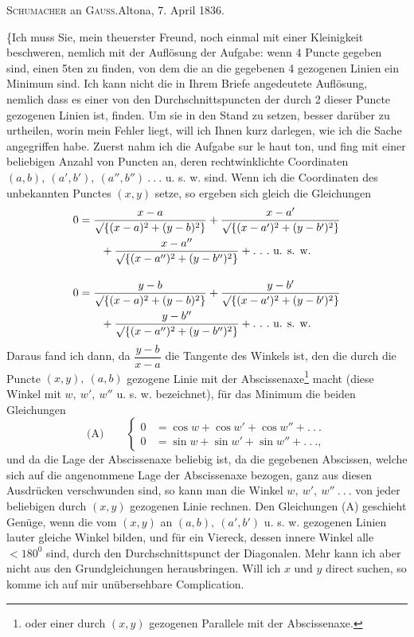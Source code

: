 \begin{center}\textsc{Schumacher} an \textsc{Gauss}.\quad Altona, 7. April 1836.\end{center}
\indent \{Ich muss Sie, mein theuerster Freund, noch einmal mit einer Kleinigkeit beschweren, nemlich mit der Auflösung der Aufgabe: wenn 4 Puncte gegeben sind, einen 5ten zu finden, von dem die an die gegebenen 4 gezogenen Linien ein Minimum sind. Ich kann nicht die in Ihrem Briefe angedeutete Auflösung, nemlich dass es einer von den Durchschnittspuncten der durch 2 dieser Puncte gezogenen Linien ist, finden. Um sie in den Stand zu setzen, besser darüber zu urtheilen, worin mein Fehler liegt, will ich Ihnen kurz darlegen, wie ich die Sache angegriffen habe.
\clearpage{}
\indent Zuerst nahm ich die Aufgabe sur le haut ton, und fing mit einer beliebigen Anzahl von Puncten an, deren rechtwinklichte Coordinaten \((a,b),\ (a',b'),\ (a'',b'')\ .\ .\ .\) u. s. w. sind. Wenn ich die Coordinaten des unbekannten Punctes \((x,y)\) setze, so ergeben sich gleich die Gleichungen
\[
\begin{aligned}
0&=\frac{x-a}{\surd\{(x-a)^2+(y-b)^2\}}+\frac{x-a'}{\surd\{(x-a')^2+(y-b')^2\}}\\
&\qquad{}+\frac{x-a''}{\surd\{(x-a'')^2+(y-b'')^2\}}+.\ .\ .\ \text{u. s. w.}\\[1em]
0&=\frac{y-b}{\surd\{(x-a)^2+(y-b)^2\}}+\frac{y-b'}{\surd\{(x-a')^2+(y-b')^2\}}\\
&\qquad{}+\frac{y-b''}{\surd\{(x-a'')^2+(y-b'')^2\}}+.\ .\ .\ \text{u. s. w.}
\end{aligned}
\]
\noindent Daraus fand ich dann, da \(\dfrac{y-b}{x-a}\) die Tangente des Winkels ist, den die durch die Puncte \((x,y),\ (a,b)\) gezogene Linie mit der Abscissenaxe\footnote{oder einer durch \((x,y)\) gezogenen Parallele mit der Abscissenaxe.} macht (diese Winkel mit \(w,\ w',\ w''\) u. s. w. bezeichnet), für das Minimum die beiden Gleichungen
\[
\text{(A)}\qquad\left\{\begin{aligned}
0&=\cos w+\cos w'+\cos w''+.\ .\ .\\
0&=\sin w+\sin w'+\sin w''+.\ .\ .,
\end{aligned}\right.
\]
\noindent und da die Lage der Abscissenaxe beliebig ist, da die gegebenen Abscissen, welche sich auf die angenommene Lage der Abscissenaxe bezogen, ganz aus diesen Ausdrücken verschwunden sind, so kann man die Winkel \(w,\ w',\ w''\ .\ .\ .\) von jeder beliebigen durch \((x,y)\) gezogenen Linie rechnen. Den Gleichungen (A) geschieht Genüge, wenn die vom \((x,y)\) an \((a,b),\ (a',b')\) u. s. w. gezogenen Linien lauter gleiche Winkel bilden, und für ein Viereck, dessen innere Winkel alle \(<180^{0}\) sind, durch den Durchschnittspunct der Diagonalen. Mehr kann ich aber nicht aus den Grundgleichungen herausbringen. Will ich \(x\) und \(y\) direct suchen, so komme ich auf mir unübersehbare Complication.

